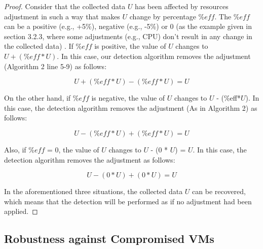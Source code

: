 \documentclass[twocolumn]{bmcart}%
\begin{document}
\begin{proof}

Consider that the collected data $U$ has been affected by resources adjustment in such a way that makes $U$ change by percentage $\%eff$. The $\%eff$ can be a positive (e.g., +5\%), negative (e.g., -5\%) or 0 (as the example given in section 3.2.3, where some adjustments (e.g., CPU) don't result in any change in the collected data) . If $\%eff $ is positive, the value of $U$ changes to $U +(\%eff*U)$. In this case, our detection algorithm removes the adjustment (Algorithm 2 line 5-9) as follows:

\begin{equation}
 U+(\%eff*U) - (\%eff*U) = U
\end{equation}

On the other hand, if $\%eff$ is negative, the value of $U$ changes to $U$ - (\%eff*$U$). In this case, the detection algorithm removes the adjustment (As in Algorithm 2) as follows:

\begin{equation}
 U-(\%eff*U) +(\%eff*U) = U
\end{equation}

Also, if $\%eff$ = 0, the value of $U$ changes to $U$ - (0 * $U$) = $U$. In this case, the detection algorithm removes the adjustment as follows:

\begin{equation}
 U-(0 * U) +(0 * U) = U
\end{equation}

In the aforementioned three situations, the collected data $U$ can be recovered, which means that the detection will be performed as if no adjustment had been applied.
\end{proof}

\subsection*{Robustness against Compromised VMs}
\end{document}
